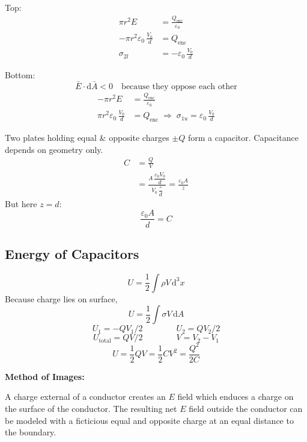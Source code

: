 \documentclass[11pt]{article}
\begin{document}
Top:
\begin{align*}
  \pi r^2E &= \frac{Q_{\mathrm{enc}}}{\varepsilon_0}\\[1ex]
  -\pi r^2\varepsilon_0\,\frac{V_0}{d} &= Q_{\mathrm{enc}}\\[1ex]
  \sigma_{2l} &= -\varepsilon_0\,\frac{V_0}{d}
\end{align*}

Bottom:
\[
  \bar{E}\cdot\mathrm{d}\bar{A} < 0 \quad\text{because they oppose each other}
\]
\begin{align*}
  -\pi r^2E &= \frac{Q_{\mathrm{enc}}}{\varepsilon_0}\\[1ex]
  \pi r^2\varepsilon_0\,\frac{V_0}{d} &= Q_{\mathrm{enc}} \;\Rightarrow\; \sigma_{1u} = \varepsilon_0\,\frac{V_0}{d}
\end{align*}

Two plates holding equal \& opposite charges $\pm Q$ form a capacitor. Capacitance depends on geometry only.
\begin{align*}
  C &= \frac{Q}{V}\\[1ex]
    &= \frac{A\,\dfrac{\varepsilon_0V_0}{d}}{V_0\,\dfrac{z}{d}} = \frac{\varepsilon_0A}{z}
\end{align*}
But here $z=d$:
\[
  \frac{\varepsilon_0A}{d} = C
\]

\subsection{Energy of Capacitors}

\begin{center}
\end{center}

\[
  U = \frac{1}{2}\int\rho V\,\mathrm{d}^3x
\]
Because charge lies on surface,
\[
  U = \frac{1}{2}\int\sigma V\,\mathrm{d}A
\]
\[
  U_1 = -QV_1/2 \qquad\qquad U_2 = QV_2/2
\]
\[
  U_{\mathrm{total}} = QV/2 \qquad\qquad V = V_2 - V_1
\]
\[
  U = \frac{1}{2}QV=\frac{1}{2}CV^2=\frac{Q^2}{2C}
\]

\textbf{Method of Images:}

\hspace{1.5em}A charge external of a conductor creates an $E$ field which enduces a charge on the surface of the conductor. The resulting net $E$ field outside the conductor can be modeled with a ficticious equal and opposite charge at an equal distance to the boundary.
\end{document}
